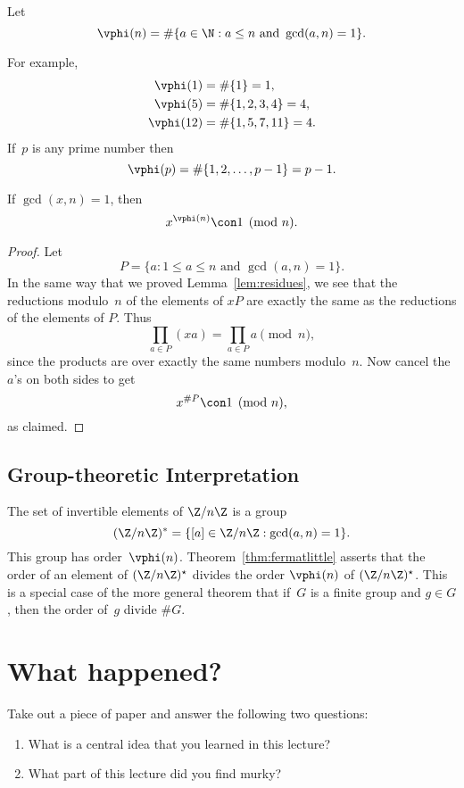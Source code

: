 \documentclass[11pt]{report}
\begin{document}
\begin{definition}
  Let
  $$
    \vphi(n) = \#\{a \in \N : a \leq n \text{ and } \gcd(a,n)=1\}.
  $$
\end{definition}
For example,
\begin{align*}
  \vphi(1)  & = \#\{1\} = 1,        \\
  \vphi(5)  & = \#\{1,2,3,4\} = 4,  \\
  \vphi(12) & = \#\{1,5,7,11\} = 4. \\
\end{align*}
If~$p$ is any prime number then
$$
  \vphi(p) = \#\{1,2,\ldots,p-1\} = p-1.
$$

\begin{theorem}\label{thm:fermatlittle}
  If $\gcd(x,n)=1$, then
  $$
    x^{\vphi(n)} \con 1\pmod{n}.
  $$
\end{theorem}
\begin{proof}
  Let
  $$
    P = \{ a : 1\leq a \leq n \text{ and } \gcd(a,n) = 1\}.
  $$
  In the same way that we proved Lemma~\ref{lem:residues},
  we see that the reductions modulo~$n$ of the elements of $xP$
  are exactly the same as the reductions of the elements of $P$.
  Thus
  $$
    \prod_{a\in P} (xa) = \prod_{a \in P} a \pmod{n},
  $$
  since the products are over exactly
  the same numbers modulo~$n$.
  Now cancel the $a$'s on both sides to get
  $$x^{\#P} \con 1\pmod{n},$$
  as claimed.
\end{proof}

\subsection{Group-theoretic Interpretation}
The set of invertible elements of $\Z/n\Z$ is a group
$$
  (\Z/n\Z)^*
  = \{ [a] \in \Z/n\Z : \gcd(a,n) = 1\}.
$$
This group has order~$\vphi(n)$.
Theorem~\ref{thm:fermatlittle} asserts that the
order of an element of $(\Z/n\Z)^\star$ divides the order $\vphi(n)$
of $(\Z/n\Z)^\star$.  This is a special case of the
more general theorem that if~$G$ is a finite group and $g\in G$,
then the order of~$g$ divide $\#G$.

\section{What happened?}
Take out a piece of paper and answer the following two questions:
\begin{enumerate}
  \item What is a central idea that you learned in this lecture?
  \item What part of this lecture did you find murky?
\end{enumerate}
\end{document}
